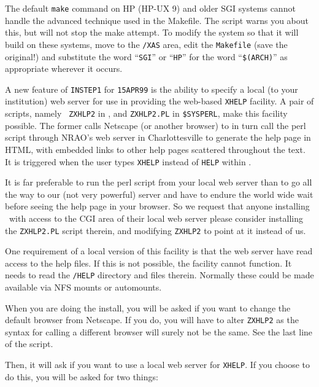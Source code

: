 The default {\tt make} command on HP (HP-UX 9) and older SGI systems
cannot handle the advanced technique used in the Makefile.  The script
warns you about this, but will not stop the make attempt.  To modify the
system so that it will build on these systems, move to the
{\tt\YSERV/XAS} area, edit the {\tt Makefile} (save the original!) and
substitute the word ``{\tt SGI}'' or ``{\tt HP}'' for the word
``{\tt\$(ARCH)}''
as appropriate wherever it occurs.

\bigskip{}

A new feature of {\tt INSTEP1} for {\tt 15APR99} is the ability to
specify a local (to your institution) web server for use in providing
the web-based {\tt XHELP} facility.  A pair of scripts, namely {\tt
ZXHLP2} in \SYSU, and {\tt ZXHLP2.PL} in {\tt\$SYSPERL}, make this
facility possible.  The former calls Netscape (or another browser) to in
turn call the perl script through NRAO's web server in Charlottesville
to generate the help page in HTML, with embedded links to other help
pages scattered throughout the text.  It is triggered when the user
types {\tt XHELP} instead of {\tt HELP} within \ttaips.

It is far preferable to run the perl script from your local web server
than to go all the way to our (not very powerful) server and have to
endure the world wide wait before seeing the help page in your browser.
So we request that anyone installing \AIPS\ with access to the CGI area
of their local web server please consider installing the {\tt ZXHLP2.PL}
script therein, and modifying {\tt ZXHLP2} to point at it instead of us.

One requirement of a local version of this facility is that the web
server have read access to the help files.  If this is not possible, the
facility cannot function.  It needs to read the {\tt\THISVER /HELP}
directory and files therein.  Normally these could be made available via
NFS mounts or automounts.

When you are doing the install, you will be asked if you want to change
the default browser from Netscape.  If you do, you will have to alter
{\tt ZXHLP2} as the syntax for calling a different browser will surely
not be the same.  See the last line of the script.

Then, it will ask if you want to use a local web server for {\tt XHELP}.
If you choose to do this, you will be asked for two things:\medskip

